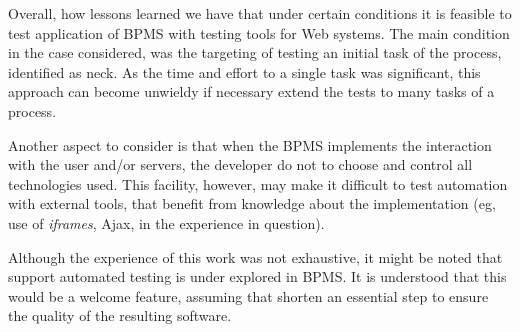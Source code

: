\documentclass[runningheads,a4paper]{llncs}
\begin{document}
Overall, how lessons learned we have that under certain conditions it is feasible to test application of BPMS with testing tools for Web systems. The main condition in the case considered, was the targeting of testing an initial task of the process, identified as neck. As the time and effort to a single task was significant, this approach can become unwieldy if necessary extend the tests to many tasks of a process.

Another aspect to consider is that when the BPMS implements the interaction with the user and/or servers, the developer do not to choose and control all technologies used. This facility, however, may make it difficult to test automation with external tools, that benefit from knowledge about the implementation (eg, use of \emph{iframes}, Ajax, in the experience in question).


Although the experience of this work was not exhaustive, it might be noted that support automated testing is under explored in BPMS. It is understood that this would be a welcome feature, assuming that shorten an essential step to ensure the quality of the resulting software.
\end{document}
